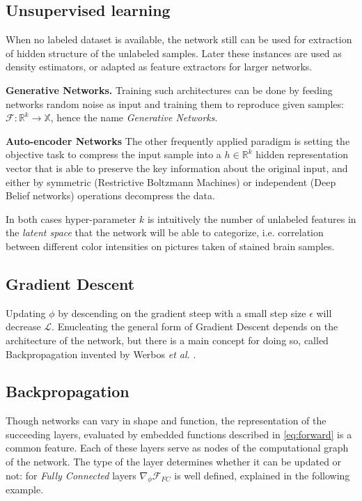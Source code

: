 \subsection{Unsupervised learning}
When no labeled dataset is available, the network still can be used for extraction of hidden structure of the unlabeled samples. Later these instances are used as density estimators, or adapted as feature extractors for larger networks.

\textbf{Generative Networks.} Training such architectures can be done by feeding networks random noise as input and training them to reproduce given samples: $\mathcal{F}:\mathbb{R}^k \rightarrow \mathbb{X}$, hence the name \emph{Generative Networks}.

\textbf{Auto-encoder Networks} The other frequently applied paradigm is setting the objective task to compress the input sample into a $h \in \mathbb{R}^k$ hidden representation vector that is able to preserve the key information about the original input, and either by symmetric (Restrictive Boltzmann Machines) or independent (Deep Belief networks) operations decompress the data.

In both cases hyper-parameter $k$ is intuitively the number of unlabeled features in the \emph{latent space} that the network will be able to categorize, i.e. correlation between different color intensities on pictures taken of stained brain samples.

\subsection{Gradient Descent}
Updating $\phi$ by descending on the gradient steep with a small step size $\epsilon$ will decrease $\mathcal{L}$.
Enucleating the general form of Gradient Descent depends on the architecture of the network, but there is a main concept for doing so, called Backpropagation invented by Werbos \emph{et al.} \cite{werbos1994roots}.

\subsection{Backpropagation} 
Though networks can vary in shape and function, the representation of the succeeding layers, evaluated by embedded functions described in \ref{eq:forward} is a common feature. Each of these layers serve as nodes of the computational graph of the network. The type of the layer determines whether it can be updated or not: for \emph{Fully Connected} layers $\nabla_\phi \mathcal{F}_{FC}$ is well defined, explained in the following example.

